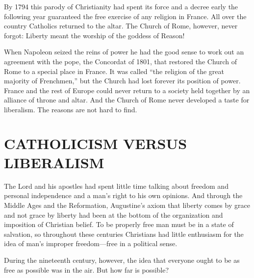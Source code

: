 By 1794 this parody of Christianity had spent its force and a decree early the following year
guaranteed the free exercise of any religion in France. All over the country Catholics returned to
the altar. The Church of Rome, however, never forgot: Liberty meant the worship of the goddess of
Reason!

When Napoleon seized the reins of power he had the good sense to work out an agreement with the
pope, the Concordat of 1801, that restored the Church of Rome to a special place in France. It was
called “the religion of the great majority of Frenchmen,” but the Church had lost forever its
position of power. France and the rest of Europe could never return to a society held together by an
alliance of throne and altar. And the Church of Rome never developed a taste for liberalism. The
reasons are not hard to find.

\section{CATHOLICISM VERSUS LIBERALISM}

The Lord and his apostles had spent little time talking about freedom and personal independence and
a man’s right to his own opinions. And through the Middle Ages and the Reformation, Augustine’s
axiom that liberty comes by grace and not grace by liberty had been at the bottom of the
organization and imposition of Christian belief. To be properly free man must be in a state of
salvation, so throughout these centuries Christians had little enthusiasm for the idea of man’s
improper freedom—free in a political sense.

During the nineteenth century, however, the idea that everyone ought to be as free as possible was
in the air. But how far is possible?

